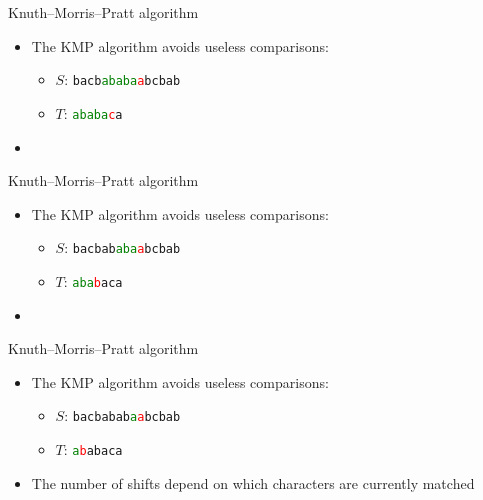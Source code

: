 \documentclass{beamer}
\begin{document}
	\begin{frame}[plain]{Knuth--Morris--Pratt algorithm}
		\begin{itemize}
			\item The KMP algorithm avoids useless comparisons:
			\begin{itemize}
				\item $S$: \texttt{bacb\textcolor{green}{ababa}\textcolor{red}{a}bcbab}
				\item $T$: \texttt{\textcolor{green}{ababa}\textcolor{red}{c}a}
			\end{itemize}
			\item[] \phantom{The number of shifts depend on which characters are currently matched}
		\end{itemize}
	\end{frame}
	\begin{frame}[plain]{Knuth--Morris--Pratt algorithm}
		\begin{itemize}
			\item The KMP algorithm avoids useless comparisons:
			\begin{itemize}
				\item $S$: \texttt{bacbab\textcolor{green}{aba}\textcolor{red}{a}bcbab}
				\item $T$: \texttt{\textcolor{green}{aba}\textcolor{red}{b}aca}
			\end{itemize}
			\item[] \phantom{The number of shifts depend on which characters are currently matched}
		\end{itemize}
	\end{frame}
	\begin{frame}[plain]{Knuth--Morris--Pratt algorithm}
		\begin{itemize}
			\item The KMP algorithm avoids useless comparisons:
			\begin{itemize}
				\item $S$: \texttt{bacbabab\textcolor{green}{a}\textcolor{red}{a}bcbab}
				\item $T$: \texttt{\textcolor{green}{a}\textcolor{red}{b}abaca}
			\end{itemize}
			\item<2-> The number of shifts depend on which characters are currently matched
		\end{itemize}
	\end{frame}
	
\end{document}
